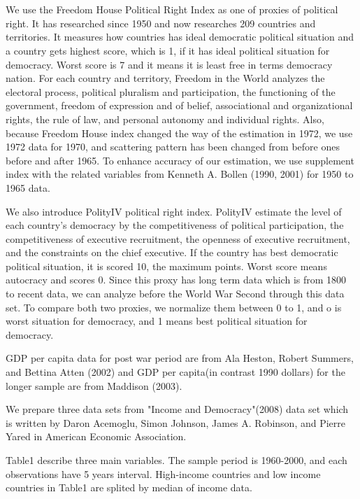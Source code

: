 \documentclass[a4paper,11pt]{article}
\begin{document}
\\

\\

We use the Freedom House Political Right Index as one of proxies of political right. It has researched since 1950 and now researches 209 countries and territories. It measures how countries has ideal democratic political situation and a country gets highest score, which is 1, if it has ideal political situation for democracy. Worst score is 7 and it means it is least free in terms democracy nation. For each country and territory, Freedom in the World analyzes the electoral process, political pluralism and participation, the functioning of the government, freedom of expression and of belief, associational and organizational rights, the rule of law, and personal autonomy and individual rights. Also, because Freedom House index changed the way of the estimation in 1972, we use 1972 data for 1970, and scattering pattern has been changed from before ones before and after 1965.  To enhance accuracy of our estimation, we use supplement index with the related variables from Kenneth A. Bollen (1990, 2001) for 1950 to 1965 data.


We also introduce PolityI\hspace{-.1em}V political right index. PolityI\hspace{-.1em}V estimate the level of each country’s democracy by the competitiveness of political participation, the competitiveness of executive recruitment, the openness of executive recruitment, and the constraints on the chief executive. If the country has best democratic political situation, it is scored 10, the maximum points. Worst score means autocracy and scores 0. Since this proxy has long term data which is from 1800 to recent data, we can analyze before the World War Second through this data set. To compare both two proxies, we normalize them between 0 to 1, and o is worst situation for democracy, and 1 means best political situation for democracy. 


GDP per capita data for post war period are from Ala Heston, Robert Summers, and Bettina Atten (2002) and GDP per capita(in contrast 1990 dollars) for the longer sample are from Maddison (2003).


We prepare three data sets from "Income and Democracy"(2008) data set which is written by Daron Acemoglu, Simon Johnson, James A. Robinson, and Pierre Yared in American Economic Association.

Table1 describe three main variables. The sample period is 1960-2000, and each observations have 5 years interval. High-income countries and low income countries in Table1 are splited by median of income data.
\end{document}
